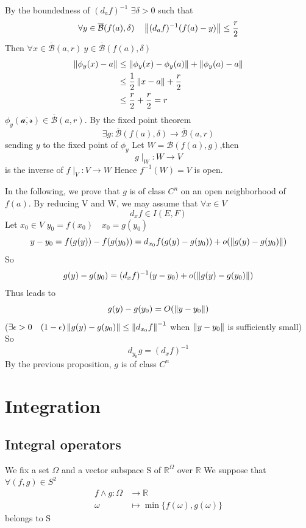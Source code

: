 \documentclass{book}
\begin{document}
By the boundedness of $(d_af)^{-1}$ $\exists\delta>0$ such that $$\forall y\in \overline{\mathcal{B}}(f(a),\delta)\quad\left\lVert (d_af)^{-1}(f(a)-y) \right\rVert\leq\frac{r}{2}$$
Then $\forall x\in \overline{\mathcal{B}}(a,r)\ y\in \overline{\mathcal{B}}(f(a),\delta)$
$$
\begin{aligned}
    \left\lVert \phi_y(x)-a \right\rVert&\leq\left\lVert \phi_y(x)-\phi_y(a) \right\rVert+\left\lVert \phi_y(a)-a \right\rVert\\
    &\leq\frac{1}{2}\left\lVert x-a \right\rVert+\frac{r}{2}\\
    &\leq \frac{r}{2}+\frac{r}{2}=r
\end{aligned}
$$ 
$\phi_y(\overline{\mathcal{a,r}})\in\overline{\mathcal{B}}(a,r)$. By the fixed point theorem$$\exists g:\overline{\mathcal{B}}(f(a),\delta)\rightarrow\overline{\mathcal{B}}(a,r)$$ sending $y$ to the fixed point of $\phi_y$
Let $W=\mathcal{B}(f(a),g)$,then $$g\mid_W:W \rightarrow V$$ is the inverse of $f\mid_V:V\rightarrow W$ Hence $f^{-1}(W)=V$ is open.

In the following, we prove that $g$ is of class $C^n$ on an open neighborhood of $f(a)$. By reducing V and W, we may assume that $\forall x\in V$
$$d_xf\in I(E,F)$$
Let $x_0\in V$ $y_0=f(x_0)\quad x_0=g(y_0)$
$$y-y_0=f(g(y))-f(g(y_0))=d_{x_0}f(g(y)-g(y_0))+o(\left\lVert g(y)-g(y_0) \right\rVert)$$
So 
$$
\begin{aligned}
    g(y)-g(y_0)=(d_xf)^{-1}(y-y_0)+o(\left\lVert g(y)-g(y_0) \right\rVert)
\end{aligned}
$$
Thus leads to 
$$g(y)-g(y_0)=O(\left\lVert y-y_0 \right\rVert)$$
($\exists \epsilon>0\quad (1-\epsilon)\left\lVert g(y)-g(y_0) \right\rVert\leq\left\lVert d_{x_0}f \right\rVert^{-1}$ when $\left\lVert y-y_0 \right\rVert$ is sufficiently small)
So $$d_{y_0}g=(d_xf)^{-1}$$ By the previous proposition, $g$ is of class $C^n$
\part{Integration}
\chapter{Integral operators}
We fix a set $\Omega$ and a vector subspace S of $\mathbb{R}^\Omega$ over $\mathbb{R}$
We suppose that $\forall(f,g)\in S^2$$$
\begin{aligned}
    f\wedge g:\Omega &\rightarrow \mathbb{R}\\
    \omega &\mapsto\min\{f(\omega),g(\omega)\}
\end{aligned}$$
belongs to S
\end{document}
